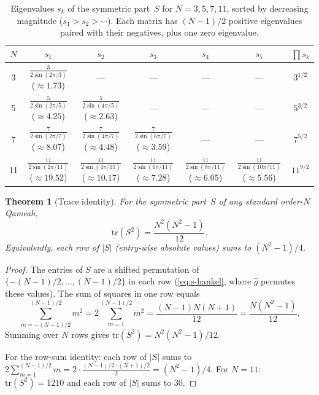 \documentclass[aip,jmp,reprint,superscriptaddress,floatfix,nofootinbib]{revtex4-2}
\newtheorem{theorem}{Theorem}
\theoremstyle{definition}
\theoremstyle{remark}
\begin{document}
\begin{table}[ht]
\centering
\caption{Eigenvalues $s_k$ of the symmetric part~$S$ for $N = 3, 5, 7,
11$, sorted by decreasing magnitude ($s_1 > s_2 > \cdots$).
Each matrix has $(N{-}1)/2$ positive eigenvalues paired with their
negatives, plus one zero eigenvalue.}
\label{tab:eigenvalues}
\begin{tabular}{ccccccc}
\toprule
$N$ & $s_1$ & $s_2$ & $s_3$ & $s_4$ & $s_5$ & $\prod s_k$ \\
\midrule
3  & $\frac{3}{2\sin(2\pi/3)}$ {\scriptsize($\approx 1.73$)} & --- & --- & --- & --- & $3^{1/2}$ \\
5  & $\frac{5}{2\sin(2\pi/5)}$ {\scriptsize($\approx 4.25$)} & $\frac{5}{2\sin(4\pi/5)}$ {\scriptsize($\approx 2.63$)} & --- & --- & --- & $5^{3/2}$ \\
7  & $\frac{7}{2\sin(2\pi/7)}$ {\scriptsize($\approx 8.07$)} & $\frac{7}{2\sin(4\pi/7)}$ {\scriptsize($\approx 4.48$)} & $\frac{7}{2\sin(6\pi/7)}$ {\scriptsize($\approx 3.59$)} & --- & --- & $7^{5/2}$ \\
11 & $\frac{11}{2\sin(2\pi/11)}$ {\scriptsize($\approx 19.52$)} & $\frac{11}{2\sin(4\pi/11)}$ {\scriptsize($\approx 10.17$)} & $\frac{11}{2\sin(6\pi/11)}$ {\scriptsize($\approx 7.28$)} & $\frac{11}{2\sin(8\pi/11)}$ {\scriptsize($\approx 6.05$)} & $\frac{11}{2\sin(10\pi/11)}$ {\scriptsize($\approx 5.56$)} & $11^{9/2}$ \\
\bottomrule
\end{tabular}
\end{table}

\begin{theorem}[Trace identity]
\label{thm:trace-identity}
For the symmetric part~$S$ of any standard order-$N$ Qameah,
\begin{equation}\label{eq:trace-s2}
  \mathrm{tr}(S^2) = \frac{N^2(N^2-1)}{12}.
\end{equation}
Equivalently, each row of $|S|$ (entry-wise absolute values) sums to
$(N^2-1)/4$.
\end{theorem}

\begin{proof}
The entries of $S$ are a shifted permutation of
$\{-(N{-}1)/2, \ldots, (N{-}1)/2\}$ in each row
(\eqref{eq:s-hankel}, where $\hat{g}$ permutes these values).
The sum of squares in one row equals
\[
  \sum_{m=-(N-1)/2}^{(N-1)/2} m^2 = 2\sum_{m=1}^{(N-1)/2} m^2
  = \frac{(N-1)N(N+1)}{12} = \frac{N(N^2-1)}{12}.
\]
Summing over $N$ rows gives $\mathrm{tr}(S^2) = N^2(N^2{-}1)/12$.

For the row-sum identity: each row of $|S|$ sums to
$2\sum_{m=1}^{(N-1)/2} m = 2 \cdot \tfrac{(N-1)/2 \cdot (N+1)/2}{2}
= (N^2{-}1)/4$.
For $N{=}11$: $\mathrm{tr}(S^2) = 1210$ and each row of $|S|$ sums
to $30$.
\end{proof}
\end{document}
